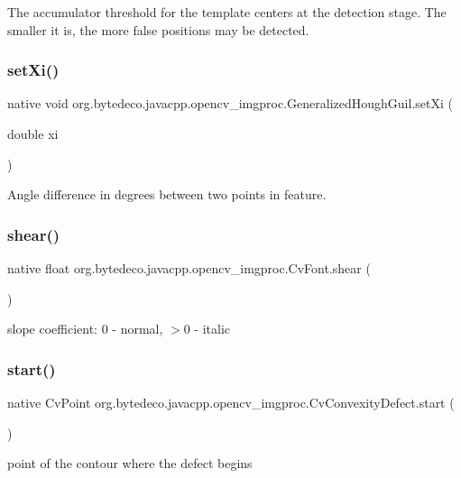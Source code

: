 The accumulator threshold for the template centers at the detection stage. The smaller it is, the more false positions may be detected. \mbox{\label{group__imgproc_ga7365e9a7f1eca9a3b2f534a0ac7b78ef}} 
\subsubsection{\texorpdfstring{set\+Xi()}{setXi()}}
{\footnotesize\ttfamily native void org.\+bytedeco.\+javacpp.\+opencv\+\_\+imgproc.\+Generalized\+Hough\+Guil.\+set\+Xi (\begin{DoxyParamCaption}\item[{double}]{xi }\end{DoxyParamCaption})}

Angle difference in degrees between two points in feature. \mbox{\label{group__imgproc_ga73ceb8658b15dd4f640dae5c1ad07ac7}} 
\subsubsection{\texorpdfstring{shear()}{shear()}}
{\footnotesize\ttfamily native float org.\+bytedeco.\+javacpp.\+opencv\+\_\+imgproc.\+Cv\+Font.\+shear (\begin{DoxyParamCaption}{ }\end{DoxyParamCaption})}

slope coefficient\+: 0 -\/ normal, $>$0 -\/ italic \mbox{\label{group__imgproc_gac3e9f4d6fda01551329024c0375d6ebb}} 
\subsubsection{\texorpdfstring{start()}{start()}}
{\footnotesize\ttfamily native Cv\+Point org.\+bytedeco.\+javacpp.\+opencv\+\_\+imgproc.\+Cv\+Convexity\+Defect.\+start (\begin{DoxyParamCaption}{ }\end{DoxyParamCaption})}

point of the contour where the defect begins \mbox{\label{group__imgproc_ga223915a9b07b19809dcae507f071bd73}} 
